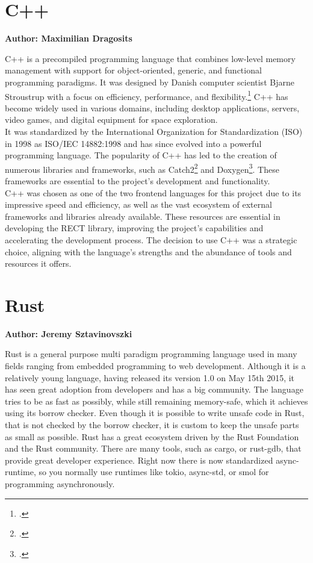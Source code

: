 \section{C++}
\textbf{Author: Maximilian Dragosits}

C++ is a precompiled programming language that combines low-level memory management with support for object-oriented, generic, and functional programming paradigms. 
It was designed by Danish computer scientist Bjarne Stroustrup with a focus on efficiency, performance, and flexibility.\footcite{lecture_essence_cpp} C++ has 
become widely used in various domains, including desktop applications, servers, video games, and digital equipment for space exploration.\\

It was standardized by the International Organization for Standardization (ISO) in 1998 as ISO/IEC 14882:1998 and has since evolved into a powerful programming 
language. The popularity of C++ has led to the creation of numerous libraries and frameworks, such as Catch2\footcite{catch2_git} and Doxygen\footcite{doxygen_main_site}. 
These frameworks are essential to the project's development and functionality.\\

C++ was chosen as one of the two frontend languages for this project due to its impressive speed and efficiency, as well as the vast ecosystem of external 
frameworks and libraries already available. These resources are essential in developing the RECT library, improving the project's capabilities and accelerating 
the development process. The decision to use C++ was a strategic choice, aligning with the language's strengths and the abundance of tools and resources it 
offers.

\section{Rust}
\textbf{Author: Jeremy Sztavinovszki}

Rust is a general purpose multi paradigm programming language used in many fields ranging from embedded programming to web development. Although it is a relatively young language, having released its version 1.0 on May 15th 2015, it has seen great adoption from developers and has a big community. The language tries to be as fast as possibly, while still remaining memory-safe, which it achieves using its borrow checker. Even though it is possible to write unsafe code in Rust, that is not checked by the borrow checker, it is custom to keep the unsafe parts as small as possible.
Rust has a great ecosystem driven by the Rust Foundation and the Rust community. There are many tools, such as cargo, or rust-gdb, that provide great developer experience.
Right now there is now standardized async-runtime, so you normally use runtimes like tokio, async-std, or smol for programming asynchronously.

